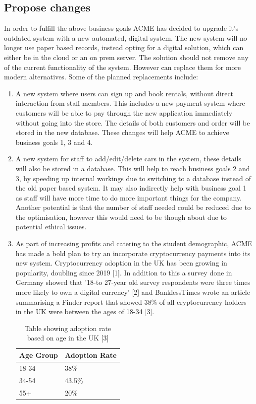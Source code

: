   \subsection{Propose changes}
  In order to fulfill the above business goals ACME has decided to upgrade it's outdated system with a new automated, digital system. The new system will no 
  longer use paper based records, instead opting for a digital solution, which can either be in the cloud or an on prem server. The solution should not remove 
  any of the current functionality of the system. However can replace them for more modern alternatives. Some of the planned replacements include:
  \begin{enumerate}
    \item A new system where users can sign up and book rentals, without direct interaction from staff members. This includes a new payment system where
    customers will be able to pay through the new application immediately without going into the store. The details of both customers and order will be
    stored in the new database. These changes will help ACME to achieve business goals 1, 3 and 4.

    \item A new system for staff to add/edit/delete cars in the system, these details will also be stored in a database. This will help to reach business goals
    2 and 3, by speeding up internal workings due to switching to a database instead of the old paper based system. It may also indirectly help with business goal 1
    as staff will have more time to do more important things for the company. Another potential is that the number of staff needed could be reduced due to the 
    optimisation, however this would need to be though about due to potential ethical issues. 
    
    \item As part of increasing profits and catering to the student demographic, ACME has made a bold plan to try an incorporate cryptocurrency payments
    into its new system. Cryptocurrency adoption in the UK has been growing in popularity, doubling since 2019 [1]. In addition to this a survey done in Germany 
    showed that '18-to 27-year old survey respondents were three times more likely to own a digital currency' [2] and BanklessTimes wrote an article summarising
    a Finder report that showed 38\% of all cryptocurrency holders in the UK were between the ages of 18-34 [3].

    \begin{table}[H]
      \centering
      \begin{tabular}{|l|l|}
        \hline
        Age Group & Adoption Rate \\ \hline
        18-34     & 38\%          \\ \hline
        34-54     & 43.5\%        \\ \hline
        55+       & 20\%  \\ \hline     
      \end{tabular}
      \caption{Table showing adoption rate based on age in the UK [3]}
    \end{table}
  \end{enumerate}

